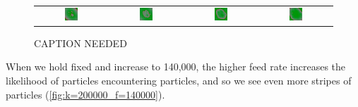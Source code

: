 \begin{figure}[h]
\begin{tabular}{c c c c}
\includegraphics[width = 0.2\textwidth]{../images/predator_prey_11_by_11_f_1_k_2_i4.png} & \includegraphics[width = 0.2\textwidth]{../images/../images/predator_prey_11_by_11_f_1_k_2_i5.png} & \includegraphics[width = 0.2\textwidth]{../images/../images/predator_prey_11_by_11_f_1_k_2_i6.png} & \includegraphics[width = 0.2\textwidth]{../images/../images/predator_prey_11_by_11_f_1_k_2_i7.png}
\end{tabular}
\caption{CAPTION NEEDED}
\label{fig:k=200000_f=100000}
\end{figure}

When we hold  fixed and increase  to 140,000, the higher feed rate increases the likelihood of  particles encountering  particles, and so we see even more stripes of  particles (\autoref{fig:k=200000_f=140000}).\\

